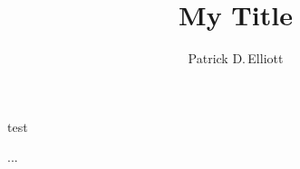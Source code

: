\documentclass{ling-slides}
\title{My Title}
\author{Patrick D.\,Elliott}
\begin{document}
\maketitle

\begin{frame}{test}

...

\end{frame}
\end{document}
